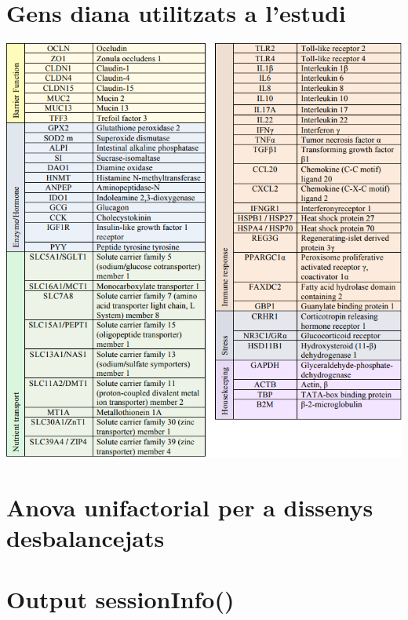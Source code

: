 \documentclass[english]{article}
\begin{document}
\section{Gens diana utilitzats a l'estudi}
\label{annex:b}
\begin{center}
\includegraphics[scale=0.7]{genes.png}
\end{center}
\clearpage
\section{Anova unifactorial per a dissenys desbalancejats}
\label{annex:c}
\clearpage
\section{Output sessionInfo()}
\label{annex:d}

\end{document}
